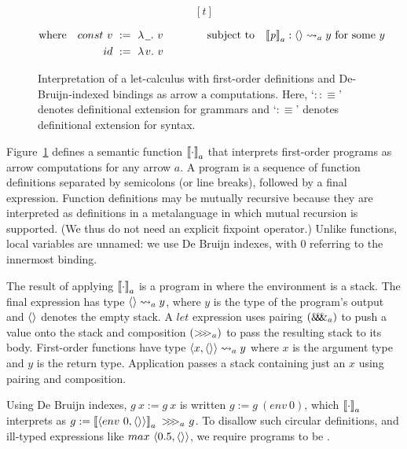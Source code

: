 \documentclass{llncs}
\newcommand{\arrow}{\rightsquigarrow}
\newcommand{\acomp}{\ensuremath{{>}\mspace{-6mu}{>}\mspace{-6mu}{>}}}
\newcommand{\apair}{\ensuremath{\mathit{\&\mspace{-7.5mu}\&\mspace{-7.5mu}\&}}}
\newcommand{\gen}{_a}
\begin{document}
\begin{figure}[!tb]
\begin{align*}
\begin{aligned}[t]
\end{aligned}
\end{align*}%
\vspace{0.5\baselineskip}%
\begin{align*}
\begin{aligned}[t]
	\text{where} && const~v &\ := \ \fun{\uscore} v
\\
	&& id &\ := \ \fun{v} v
\end{aligned}
&\tab\tab\tab\tab
\begin{aligned}[t]
	\text{subject to} && \meaningof{\mathit{p}}\gen : \pair{} \arrow\gen y \ \text{for some $y$}
\end{aligned}
\end{align*}

\bottomhrule
\caption[ ]{Interpretation of a let-calculus with first-order definitions and De-Bruijn-indexed bindings as arrow $\mathrm{a}$ computations.
Here, `$::\equiv$' denotes definitional extension for grammars and `$:\equiv$' denotes definitional extension for syntax.
}
\label{fig:semantic-function}
\end{figure}

Figure~\ref{fig:semantic-function} defines a semantic function $\meaningof{\cdot}\gen$ that interprets first-order programs as arrow computations for any arrow $a$.
A program is a sequence of function definitions separated by semicolons (or line breaks), followed by a final expression.
Function definitions may be mutually recursive because they are interpreted as definitions in a metalanguage in which mutual recursion is supported.
(We thus do not need an explicit fixpoint operator.)
Unlike functions, local variables are unnamed: we use De Bruijn indexes, with $0$ referring to the innermost binding.

The result of applying $\meaningof{\cdot}\gen$ is a \lzfclang program in  where the environment is a stack.
The final expression has type $\pair{} \arrow\gen y$, where $y$ is the type of the program's output and $\langle{}\rangle$ denotes the empty stack.
A $let$ expression uses pairing $(\apair\gen)$ to push a value onto the stack and composition $(\acomp\gen)$ to pass the resulting stack to its body.
First-order functions have type $\pair{x,\pair{}} \arrow\gen y$ where $x$ is the argument type and $y$ is the return type.
Application passes a stack containing just an $x$ using pairing and composition.

Using De Bruijn indexes, $g~x := g~x$ is written $g := g~(env~0)$, which $\meaningof{\cdot}\gen$ interprets as $g := \meaningof{\pair{env~0,\pair{}}}\gen~\acomp\gen~g$.
To disallow such circular definitions, and ill-typed expressions like $max~\langle{0.5,\langle{}\rangle}\rangle$, we require programs to be .
\end{document}
